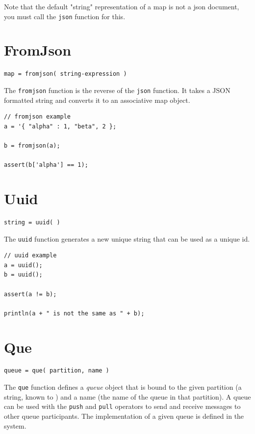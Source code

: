 Note that the default "string" representation of a map is not a json document, you must call the \verb+json+ function for this.

\section{FromJson}

\begin{verbatim}
map = fromjson( string-expression )
\end{verbatim}

The \verb+fromjson+ function is the reverse of the \verb+json+ function. It takes a JSON formatted string and converts it to an associative map object.

\begin{lstlisting}[caption={FromJson example}]
// fromjson example
a = '{ "alpha" : 1, "beta", 2 };

b = fromjson(a);

assert(b['alpha'] == 1);

\end{lstlisting}

\section{Uuid}
\begin{verbatim}
string = uuid( )
\end{verbatim}

The \verb+uuid+ function generates a new unique string that can be used as a unique id.

\begin{lstlisting}[caption={UUID example}]
// uuid example
a = uuid();
b = uuid();

assert(a != b);

println(a + " is not the same as " + b);

\end{lstlisting}

\section{Que}

\begin{verbatim}
queue = que( partition, name )
\end{verbatim}

The \verb+que+ function defines a \emph{queue} object that is bound to the given partition (a string, known to \Rapture) and a name (the name of the queue in that partition). A queue can be used with the \verb+push+ and \verb+pull+ operators to send and receive messages to other queue participants. The implementation of a given queue is defined in the \Rapture system.

